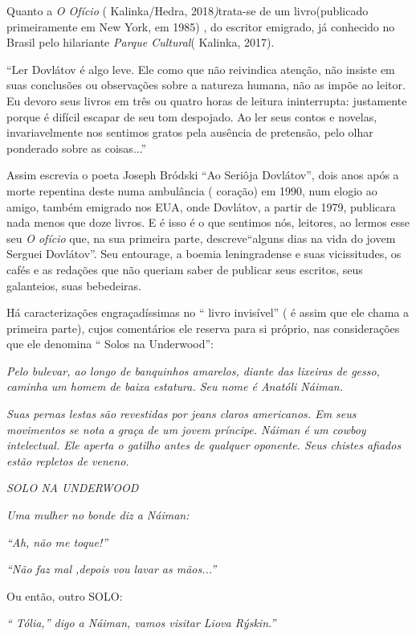 \protect\hypertarget{__DdeLink__16933_1485881000}{}{}Quanto a \emph{O
Ofício} ( Kalinka/Hedra, 2018\emph{)}trata-se de um livro(publicado
primeiramente em New York, em 1985) , do escritor emigrado, já conhecido
no Brasil pelo hilariante \emph{Parque Cultural}( Kalinka, 2017).

``Ler Dovlátov é algo leve. Ele como que não reivindica atenção, não
insiste em suas conclusões ou observações sobre a natureza humana, não
as impõe ao leitor. Eu devoro seus livros em três ou quatro horas de
leitura ininterrupta: justamente porque é difícil escapar de seu tom
despojado. Ao ler seus contos e novelas, invariavelmente nos sentimos
gratos pela ausência de pretensão, pelo olhar ponderado sobre as
coisas...''

Assim escrevia o poeta Joseph Bródski ``Ao Seriôja Dovlátov'', dois anos
após a morte repentina deste numa ambulância ( coração) em 1990, num
elogio ao amigo, também emigrado nos EUA, onde Dovlátov, a partir de
1979, publicara nada menos que doze livros. E é isso é o que sentimos
nós, leitores, ao lermos esse seu \emph{O ofício} que, na sua primeira
parte, descreve``alguns dias na vida do jovem Serguei Dovlátov''. Seu
entourage, a boemia leningradense e suas vicissitudes, os cafés e as
redações que não queriam saber de publicar seus escritos, seus
galanteios, suas bebedeiras.

Há caracterizações engraçadíssimas no `` livro invisível'' ( é assim que
ele chama a primeira parte), cujos comentários ele reserva para si
próprio, nas considerações que ele denomina `` Solos na Underwood'':

\emph{Pelo bulevar, ao longo de banquinhos amarelos, diante das lixeiras
de gesso, caminha um homem de baixa estatura. Seu nome é Anatóli
Náiman.}

\emph{Suas pernas lestas são revestidas por jeans claros americanos. Em
seus movimentos se nota a graça de um jovem príncipe. Náiman é um cowboy
intelectual. Ele aperta o gatilho antes de qualquer oponente. Seus
chistes afiados estão repletos de veneno.}

\emph{SOLO NA UNDERWOOD}

\emph{Uma mulher no bonde diz a Náiman:}

\emph{``Ah, não me toque!''}

\emph{``Não faz mal ,depois vou lavar as mãos...''}

Ou então, outro SOLO:

\emph{`` Tólia,'' digo a Náiman, vamos visitar Liova Rýskin.''}

